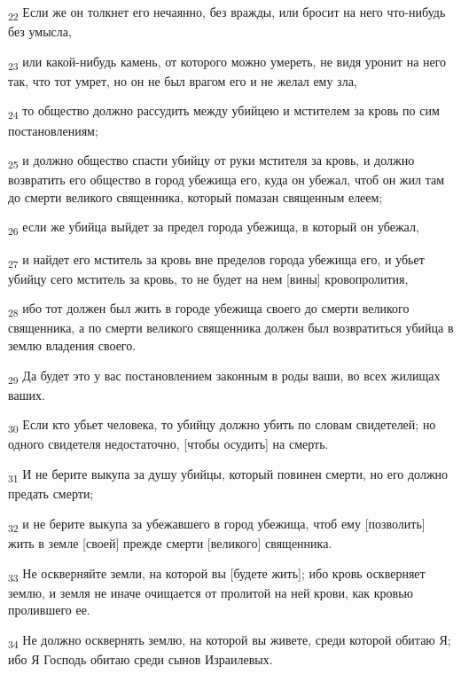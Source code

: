 \begin{tcolorbox}
\textsubscript{22} Если же он толкнет его нечаянно, без вражды, или бросит на него что-нибудь без умысла,
\end{tcolorbox}
\begin{tcolorbox}
\textsubscript{23} или какой-нибудь камень, от которого можно умереть, не видя уронит на него так, что тот умрет, но он не был врагом его и не желал ему зла,
\end{tcolorbox}
\begin{tcolorbox}
\textsubscript{24} то общество должно рассудить между убийцею и мстителем за кровь по сим постановлениям;
\end{tcolorbox}
\begin{tcolorbox}
\textsubscript{25} и должно общество спасти убийцу от руки мстителя за кровь, и должно возвратить его общество в город убежища его, куда он убежал, чтоб он жил там до смерти великого священника, который помазан священным елеем;
\end{tcolorbox}
\begin{tcolorbox}
\textsubscript{26} если же убийца выйдет за предел города убежища, в который он убежал,
\end{tcolorbox}
\begin{tcolorbox}
\textsubscript{27} и найдет его мститель за кровь вне пределов города убежища его, и убьет убийцу сего мститель за кровь, то не будет на нем [вины] кровопролития,
\end{tcolorbox}
\begin{tcolorbox}
\textsubscript{28} ибо тот должен был жить в городе убежища своего до смерти великого священника, а по смерти великого священника должен был возвратиться убийца в землю владения своего.
\end{tcolorbox}
\begin{tcolorbox}
\textsubscript{29} Да будет это у вас постановлением законным в роды ваши, во всех жилищах ваших.
\end{tcolorbox}
\begin{tcolorbox}
\textsubscript{30} Если кто убьет человека, то убийцу должно убить по словам свидетелей; но одного свидетеля недостаточно, [чтобы осудить] на смерть.
\end{tcolorbox}
\begin{tcolorbox}
\textsubscript{31} И не берите выкупа за душу убийцы, который повинен смерти, но его должно предать смерти;
\end{tcolorbox}
\begin{tcolorbox}
\textsubscript{32} и не берите выкупа за убежавшего в город убежища, чтоб ему [позволить] жить в земле [своей] прежде смерти [великого] священника.
\end{tcolorbox}
\begin{tcolorbox}
\textsubscript{33} Не оскверняйте земли, на которой вы [будете жить]; ибо кровь оскверняет землю, и земля не иначе очищается от пролитой на ней крови, как кровью пролившего ее.
\end{tcolorbox}
\begin{tcolorbox}
\textsubscript{34} Не должно осквернять землю, на которой вы живете, среди которой обитаю Я; ибо Я Господь обитаю среди сынов Израилевых.
\end{tcolorbox}
